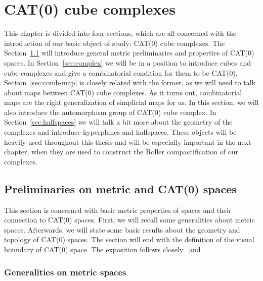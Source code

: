 \section{CAT(0) cube complexes}
\label{sec:complexes}
This chapter is divided into four sections, which are all concerned with the introduction of our basic object of study: CAT(0) cube complexes. The Section~\ref{sec:metric} will introduce general metric preliminaries and properties of CAT(0) spaces. In Section~\ref{sec:complex} we will be in a position to introduce cubes and cube complexes and give a combinatorial condition for them to be CAT(0). Section~\ref{sec:comb-map} is closely related with the former, as we will need to talk about maps between CAT(0) cube complexes. As it turns out, combinatorial maps are the right generalization of simplicial maps for us. In this section, we will also introduce the automorphism group of CAT(0) cube complex. In Section~\ref{sec:halfspaces} we will talk a bit more about the geometry of the complexes and introduce hyperplanes and halfspaces. These objects will be heavily used throughout this thesis and will be especially important in the next chapter, when they are used to construct the Roller compactification of our complexes.

\subsection{Preliminaries on metric and CAT(0) spaces}
\label{sec:metric}
This section is concerned with basic metric properties of spaces and their connection to CAT(\(0\)) spaces. First, we will recall some generalities about metric spaces. Afterwards, we will state some basic results about the geometry and topology of CAT(0) spaces. The section will end with the definition of the visual boundary of CAT(0) space. The exposition follows closely~\cite{MR1744486} and~\cite{Rolli2012}.

\subsubsection*{Generalities on metric spaces}
\label{sec:gen-met}

